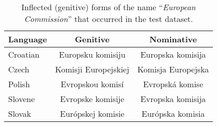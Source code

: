 \documentclass[11pt]{article}
\begin{document}
\begin{table}
  \begin{center}
    \begin{footnotesize}
      \begin{tabular}{lcc}
        \toprule 
        {\textbf{Language}} & {\textbf{Genitive}} & {\textbf{Nominative}}\\
        \midrule
				Croatian & Europsku komisiju & Europska komisija \\
				Czech & Komisji Europejskiej & Komisja Europejska \\
        Polish & Evropskou komisí & Evropská komise \\
        Slovene & Evropske komisije & Evropska komisija \\
        Slovak & Európskej komisie & Európska komisia \\
        \bottomrule
      \end{tabular}
    \end{footnotesize}
  \end{center}
  \caption{Inflected (genitive) forms of the name ``\textit{European Commission}'' that occurred in the test dataset.} 
  \label{tab:inflected}
\end{table}
\end{document}
